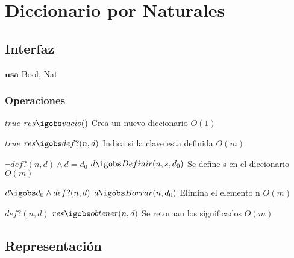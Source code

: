 
\section{Diccionario por Naturales}

\subsection{Interfaz}

$\textbf{usa}$ Bool, Nat


\subsubsection*{Operaciones}


 {$true$}
 {$res \igobs vacio()$}
 {Crea un nuevo diccionario}
 {$O(1)$}
 {}
 
  {$true$}
  {$res \igobs def?(n,d)$}
  {Indica si la clave esta definida}
  {$O(m)$}
  {}

  {$\neg def?(n,d) \land d=d_0$}
  {$d \igobs Definir(n, s, d_0)$}
  {Se define s en el diccionario}
  {$O(m)$}
  {}

 {$d \igobs d_0 \land def?(n,d)$}
 {$d \igobs Borrar(n,d_0)$}
 {Elimina el elemento n}
 {$O(m)$}
 {}

 {$def?(n,d)$}
 {$res \igobs obtener(n,d)$}
 {Se retornan los significados}
 {$O(m)$}
 {}


\subsection{Representación}

